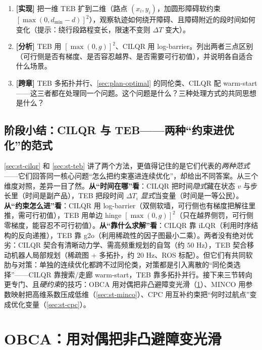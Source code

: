 \begin{practice}
\begin{enumerate}
  \item \textbf{[实现]} 把一维 TEB 扩到二维（路点 $(x_i,y_i)$，加圆形障碍软约束 $[\max(0,d_{\min}-d)]^2$），观察轨迹如何绕开障碍、且障碍附近的段时间如何变化（提示：绕行段路程变长，限速不变则 $\Delta T$ 变大）。
  \item \textbf{[分析]} TEB 用 $[\max(0,g)]^2$、CILQR 用 log-barrier。列出两者三点区别（可行侧是否有梯度、是否容忍越界、是否需要可行初值），并说明各自适合什么场景。
  \item \textbf{[跨章]} TEB 多拓扑并行、\cref{sec:plan-optimal} 的同伦类、CILQR 配 warm-start——这三者都在处理同一个问题。这个问题是什么？三种处理方式的共同思想是什么？
\end{enumerate}
\end{practice}

\subsection*{阶段小结：CILQR 与 TEB——两种“约束进优化”的范式}
\cref{sec:st-cilqr} 和 \cref{sec:st-teb} 讲了两个方法，更值得记住的是它们代表的\emph{两种范式}——它们回答同一核心问题“怎么把约束塞进连续优化”，却给出不同答案。从三个维度对照，差异一目了然。\textbf{从“时间在哪”看}：CILQR 把时间\emph{隐式}藏在状态 $v$ 与步长里（时间是副产品），TEB 把段时间 $\Delta T_i$ \emph{显式}当变量（时间是一等公民）。\textbf{从“约束怎么进”看}：CILQR 用 log-barrier（双侧软墙，可行侧也有梯度把解往里推，需可行初值），TEB 用单边 hinge $[\max(0,g)]^2$（只在越界侧罚，可行侧零梯度，能容忍不可行初值）。\textbf{从“靠什么求解”看}：CILQR 靠 iLQR（利用时序结构的反向递推），TEB 靠 g2o（利用稀疏性的因子图最小二乘）。两者没有绝对优劣：CILQR 契合有清晰动力学、需高频重规划的自驾（约 $50$ Hz），TEB 契合移动机器人局部规划（稀疏图 + 多拓扑，约 $20$ Hz、ROS 标配）。但它们有共同软肋与对策：单独的连续优化都跨不过同伦类，对策都是引入离散的“同伦类选择”——CILQR 靠搜索/走廊 warm-start，TEB 靠多拓扑并行。接下来三节转向更专门、且\emph{硬约束}的技巧：OBCA 用对偶把非凸避障变光滑（\cref{sec:st-obca}）、MINCO 用参数映射把高维系数压成低维（\cref{sec:st-minco}）、CPC 用互补约束把“何时过航点”变成优化变量（\cref{sec:st-cpc}）。

\section{OBCA：用对偶把非凸避障变光滑}
\label{sec:st-obca}

